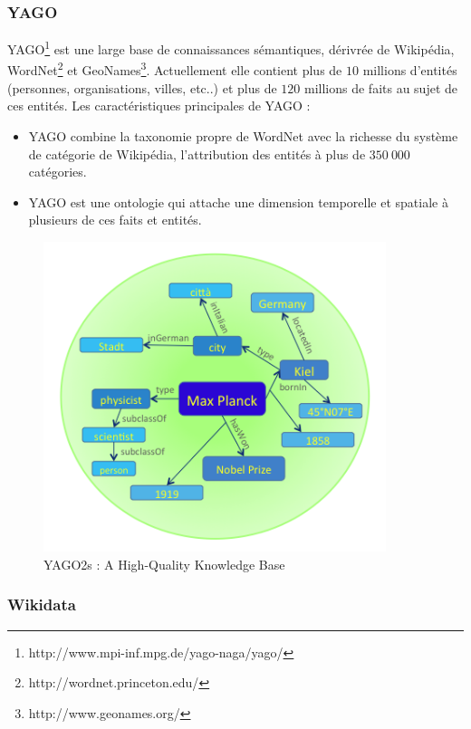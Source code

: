 \subsubsection{YAGO}
YAGO\footnote{http://www.mpi-inf.mpg.de/yago-naga/yago/} est une large base de connaissances sémantiques, dérivrée de Wikipédia, WordNet\footnote{http://wordnet.princeton.edu/} et GeoNames\footnote{http://www.geonames.org/}. Actuellement elle contient plus de $10$ millions d’entités (personnes, organisations, villes, etc..) et plus de $120$ millions de faits au sujet de ces entités.
\newline
Les caractéristiques principales de YAGO :
\begin{itemize}
\item YAGO combine la taxonomie propre de WordNet avec la richesse du système de catégorie de Wikipédia, l'attribution des entités à plus de $350~000$ catégories.
\item YAGO est une ontologie qui attache une dimension temporelle et spatiale à plusieurs de ces faits et entités.
\end{itemize}
\begin{figure}[H]
\centering
\includegraphics[width=10cm]{yago.png}
\caption{YAGO2s : A High-Quality Knowledge Base}
\end{figure}
\newpage
\subsubsection{Wikidata}

